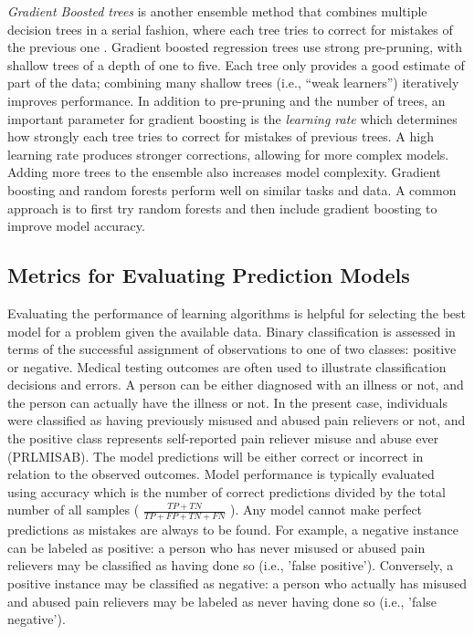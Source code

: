 \documentclass[sigconf]{acmart}
\begin{document}

\emph{Gradient Boosted trees} is another ensemble method that combines 
multiple decision trees in a serial fashion, where each tree tries to correct 
for mistakes of the previous one \cite{muller17}. Gradient boosted regression 
trees use strong pre-pruning, with shallow trees of a depth of one to five. 
Each tree only provides a good estimate of part of the data; combining many 
shallow trees (i.e., ``weak learners'') iteratively improves performance. 
In addition to pre-pruning and the number of trees, an important parameter 
for gradient boosting is the \emph{learning rate} which determines how 
strongly each tree tries to correct for mistakes of previous trees. A high 
learning rate produces stronger corrections, allowing for more complex models. 
Adding more trees to the ensemble also increases model complexity. Gradient 
boosting and random forests perform well on similar tasks and data. A common 
approach is to first try random forests and then include gradient boosting 
to improve model accuracy. 


\subsection{Metrics for Evaluating Prediction Models}

Evaluating the performance of learning algorithms is helpful for selecting 
the best model for a problem given the available data. Binary classification 
is assessed in terms of the successful assignment of observations to one of 
two classes: positive or negative. Medical testing outcomes are often used to 
illustrate classification decisions and errors. A person can be either 
diagnosed with an illness or not, and the person can actually have the 
illness or not. In the present case, individuals were classified as having 
previously misused and abused pain relievers or not, and the positive class
represents self-reported pain reliever misuse and abuse ever (PRLMISAB).
The model predictions will be either correct or incorrect in relation to the
observed outcomes. Model performance is typically evaluated using accuracy 
which is the number of correct predictions divided by the total number of 
all samples ( \(\frac{TP+TN}{TP+FP+TN+FN}\) ). Any model cannot make perfect 
predictions as mistakes are always to be found. For example, a negative
instance can be labeled as positive: a person who has never misused or abused 
pain relievers may be classified as having done so (i.e., 'false positive'). 
Conversely, a positive instance may be classified as negative: a person who 
actually has misused and abused pain relievers may be labeled as never having 
done so (i.e., 'false negative').
\end{document}
